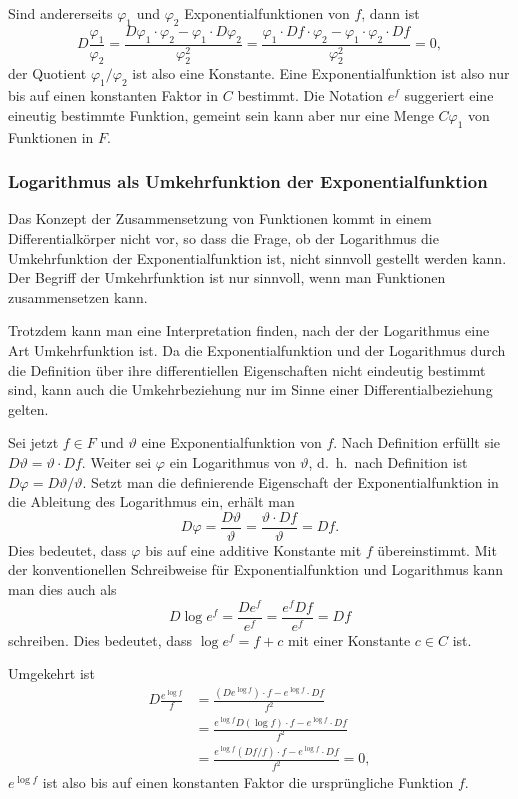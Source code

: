 Sind andererseits $\varphi_1$ und $\varphi_2$ Exponentialfunktionen
von $f$, dann ist
\[
D
\frac{\varphi_1}{\varphi_2}
=
\frac{D\varphi_1\cdot\varphi_2 - \varphi_1\cdot D\varphi_2}{\varphi_2^2}
=
\frac{
\varphi_1\cdot Df\cdot\varphi_2 - \varphi_1\cdot \varphi_2\cdot Df
}{\varphi_2^2}
=
0,
\]
der Quotient $\varphi_1/\varphi_2$ ist also eine Konstante.
Eine Exponentialfunktion ist also nur bis auf einen konstanten
Faktor in $C$ bestimmt.
Die Notation $e^f$ suggeriert eine eineutig bestimmte Funktion,
gemeint sein kann aber nur eine Menge $C\varphi_1$ von Funktionen in $F$.

%
%
\subsubsection{Logarithmus als Umkehrfunktion der Exponentialfunktion}
Das Konzept der Zusammensetzung von Funktionen kommt in einem
Differentialkörper nicht vor, so dass die Frage, ob der
Logarithmus die Umkehrfunktion der Exponentialfunktion ist,
nicht sinnvoll gestellt werden kann.
Der Begriff der Umkehrfunktion ist nur sinnvoll, wenn man
%
Funktionen zusammensetzen kann.

Trotzdem kann man eine Interpretation finden, nach der der Logarithmus
eine Art Umkehrfunktion ist.
Da die Exponentialfunktion und der Logarithmus durch die
Definition über ihre differentiellen Eigenschaften nicht eindeutig 
bestimmt sind, kann auch die Umkehrbeziehung nur im Sinne einer
Differentialbeziehung gelten.

Sei jetzt $f\in F$ und $\vartheta$ eine Exponentialfunktion von $f$.
Nach Definition erfüllt sie $D\vartheta=\vartheta\cdot Df$.
Weiter sei $\varphi$ ein Logarithmus von $\vartheta$, d.~h.~nach
Definition ist $D\varphi=D\vartheta/\vartheta$.
Setzt man die definierende Eigenschaft der Exponentialfunktion
in die Ableitung des Logarithmus ein, erhält man
\[
D\varphi
=
\frac{D\vartheta}{\vartheta}
=
\frac{\vartheta\cdot Df}{\vartheta}
=
Df.
\]
Dies bedeutet, dass $\varphi$ bis auf eine additive Konstante mit
$f$ übereinstimmt.
Mit der konventionellen Schreibweise für Exponentialfunktion und
Logarithmus kann man dies auch als
\[
D\log e^f
=
\frac{De^f}{e^f}
=
\frac{e^f Df}{e^f}
=
Df
\]
schreiben.
Dies bedeutet, dass $\log e^f = f+c$ mit einer Konstante $c\in C$ ist.

Umgekehrt ist
\begin{align*}
D\frac{e^{\log f}}{f}
&=
\frac{(De^{\log f})\cdot f - e^{\log f}\cdot Df}{f^2}
\\
&=
\frac{e^{\log f}D(\log f)\cdot f - e^{\log f}\cdot Df }{f^2}
\\
&=
\frac{e^{\log f} (Df/f)\cdot f - e^{\log f}\cdot Df }{f^2}
=
0,
\end{align*}
$e^{\log f}$ ist also bis auf einen konstanten Faktor die ursprüngliche
Funktion $f$.

